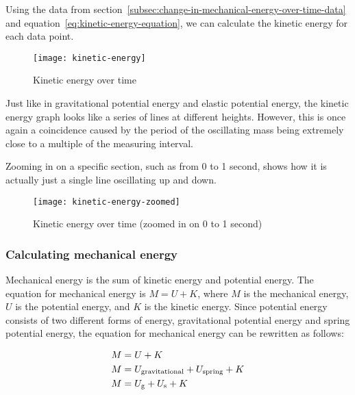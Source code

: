 \documentclass{article}
\begin{document}
                Using the data from section~\ref{subsec:change-in-mechanical-energy-over-time-data} and equation~\ref{eq:kinetic-energy-equation}, we can calculate the kinetic energy for each data point.
                
                \begin{figure}[H]
                    \centering
                    \texttt{[image: kinetic-energy]}
                    \caption{Kinetic energy over time}
                    \label{fig:kinetic-energy}
                \end{figure}
                
                Just like in gravitational potential energy and elastic potential energy, the kinetic energy graph looks like a series of lines at different heights.
                However, this is once again a coincidence caused by the period of the oscillating mass being extremely close to a multiple of the measuring interval.
                
                Zooming in on a specific section, such as from 0 to 1 second, shows how it is actually just a single line oscillating up and down.
                
                \begin{figure}[H]
                    \centering
                    \texttt{[image: kinetic-energy-zoomed]}
                    \caption{Kinetic energy over time (zoomed in on 0 to 1 second)}
                    \label{fig:kinetic-energy-zoomed}
                \end{figure}
            
            \subsubsection{Calculating mechanical energy}
                Mechanical energy is the sum of kinetic energy and potential energy.
                The equation for mechanical energy is $M = U + K$, where $M$ is the mechanical energy, $U$ is the potential energy, and $K$ is the kinetic energy.
                Since potential energy consists of two different forms of energy, gravitational potential energy and spring potential energy, the equation for mechanical energy can be rewritten as follows:
                
                \begin{equation}
                    \begin{aligned}
                        \notag
                        M &= U + K \\
                        M &= U_{\text{gravitational}} + U_{\text{spring}} + K \\
                        M &= U_{\text{g}} + U_{\text{s}} + K \\
                    \end{aligned}\label{eq:mechanical-energy-equation}
                \end{equation}
                
\end{document}
